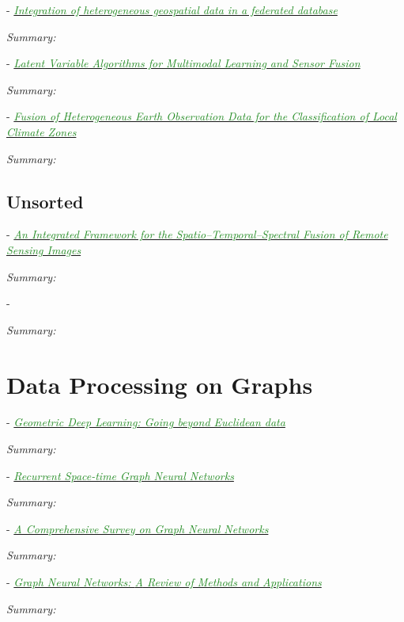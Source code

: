 \documentclass[]{article}
\newcommand{\paperentry}[4]{
            \hangindent=1cm
            \cite{#1} - \href{run:../References/#3}{\textcolor{ForestGreen}{\textit{#2}}}
            
            \noindent            
            \begin{minipage}[t]{0.1\linewidth}\hfill\end{minipage}
            \begin{minipage}[t]{0.8\linewidth}\textcolor{NavyBlue}{{\textit{Summary:}}}#4\end{minipage}
            \vspace{.25cm}
          }
\begin{document}
		\paperentry{Butenuth2007HeterogeneousGeospatialData}
		{Integration of heterogeneous geospatial data in a federated database}
		{Fusion/Butenuth2007HeterogeneousGeospatialData.pdf}
		{}
		
			
		\paperentry{Guo2019LVAforMultimodalLearningandSensorFusion}
		{Latent Variable Algorithms for Multimodal Learning and Sensor Fusion}
		{Fusion/Guo2019LVAforMultimodalLearningandSensorFusion.pdf}
		{}
		
		\paperentry{Zhang2019FusionHeteroEarthObsClimateZones}
		{Fusion of Heterogeneous Earth Observation Data for the Classification of Local Climate Zones}
		{Fusion/Zhang2019FusionHeteroEarthObsClimateZones.pdf}
		{}
	
	\subsection{Unsorted}
	
	\paperentry{Shen2016SpatioTemporalSpectralFusion}
	{An Integrated Framework for the Spatio–Temporal–Spectral Fusion of Remote Sensing Images}
	{Fusion/Shen2016SpatioTemporalSpectralFusion.pdf}
	{}
	
	
	\paperentry{}
	{}
	{}
	{}
	
\section{Data Processing on Graphs}	

\paperentry{Bronstein2017GeometricDeepLearning}
{Geometric Deep Learning: Going beyond Euclidean data}
{Manifold_Representation_Learning/NeuralNets/Bronstein2017GeometricDeepLearning.pdf}
{}

\paperentry{Nicolicioiu2019RecurrentSpaceTimeGraphNN}
{Recurrent Space-time Graph Neural Networks}
{Manifold_Representation_Learning/NeuralNets/Nicolicioiu2019RecurrentSpaceTimeGraphNN.pdf}
{}

\paperentry{Wu2019SurveyGraphConvolutionalNeuralNetworks}
{A Comprehensive Survey on Graph Neural Networks}
{Manifold_Representation_Learning/NeuralNets/Wu2019SurveyGraphConvolutionalNeuralNetworks.pdf}
{}

\paperentry{Zhou2019ReviewGraphNeuralNetworks}
{Graph Neural Networks: {A} Review of Methods and Applications}
{Manifold_Representation_Learning/NeuralNets/Zhou2019ReviewGraphNeuralNetworks.pdf}
{}

\end{document}
